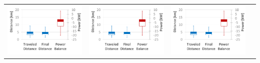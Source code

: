 \begin{table}[b]
\begin{tabularx}{\textwidth}{|Y|Y|Y|Y|}
		\includegraphics[trim=0 0 0 -3,scale=0.285]{../gfx/data/image001.png} &
		\includegraphics[trim=0 0 0 -3,scale=0.285]{../gfx/data/image001.png} &
		\includegraphics[trim=0 0 0 -3,scale=0.285]{../gfx/data/image001.png} &

\end{tabularx}
\end{table}
